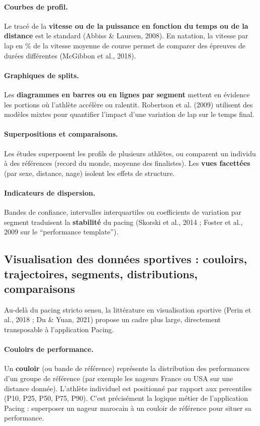 \documentclass[11pt,a4paper]{article}
\begin{document}
\paragraph{Courbes de profil.}
Le tracé de la \textbf{vitesse ou de la puissance en fonction du temps ou de la distance} est le standard (Abbiss \& Laursen, 2008). En natation, la vitesse par lap en \% de la vitesse moyenne de course permet de comparer des épreuves de durées différentes (McGibbon et al., 2018).

\paragraph{Graphiques de splits.}
Les \textbf{diagrammes en barres ou en lignes par segment} mettent en évidence les portions où l'athlète accélère ou ralentit. Robertson et al. (2009) utilisent des modèles mixtes pour quantifier l'impact d'une variation de lap sur le temps final.

\paragraph{Superpositions et comparaisons.}
Les études superposent les profils de plusieurs athlètes, ou comparent un individu à des références (record du monde, moyenne des finalistes). Les \textbf{vues facettées} (par sexe, distance, nage) isolent les effets de structure.

\paragraph{Indicateurs de dispersion.}
Bandes de confiance, intervalles interquartiles ou coefficients de variation par segment traduisent la \textbf{stabilité} du pacing (Skorski et al., 2014 ; Foster et al., 2009 sur le ``performance template'').

\subsection{Visualisation des données sportives : couloirs, trajectoires, segments, distributions, comparaisons}

Au-delà du pacing stricto sensu, la littérature en visualisation sportive (Perin et al., 2018 ; Du \& Yuan, 2021) propose un cadre plus large, directement transposable à l'application Pacing.

\paragraph{Couloirs de performance.}
Un \textbf{couloir} (ou bande de référence) représente la distribution des performances d'un groupe de référence (par exemple les nageurs France ou USA sur une distance donnée). L'athlète individuel est positionné par rapport aux percentiles (P10, P25, P50, P75, P90). C'est précisément la logique métier de l'application Pacing : superposer un nageur marocain à un couloir de référence pour situer sa performance.
\end{document}
